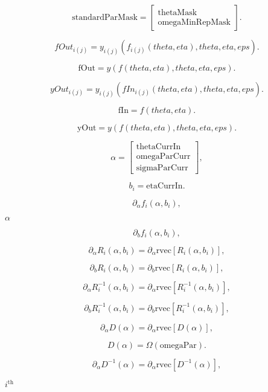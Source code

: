 \documentclass{article}
\begin{document}
\[ \mbox{standardParMask} = \left[ \begin{array}{c} \mbox{thetaMask} \\ \mbox{omegaMinRepMask} \end{array} \right] . \]
\pagebreak

\[ fOut_{i(j)} = y_{i(j)}( f_{i(j)}(theta, eta), theta, eta, eps) . \]
\pagebreak

\[ \mbox{fOut} = y(f(theta, eta), theta, eta, eps) . \]
\pagebreak

\[ yOut_{i(j)} = y_{i(j)}( fIn_{i(j)}(theta, eta), theta, eta, eps) . \]
\pagebreak

\[ \mbox{fIn} = f(theta, eta) . \]
\pagebreak

\[ \mbox{yOut} = y(f(theta, eta), theta, eta, eps) . \]
\pagebreak

\[ \alpha = \left[ \begin{array}{c} \mbox{thetaCurrIn} \\ \mbox{omegaParCurr} \\ \mbox{sigmaParCurr} \end{array} \right] , \]
\pagebreak

\[ b_i = \mbox{etaCurrIn} . \]
\pagebreak

\[ \partial_{\alpha} f_i(\alpha, b_i) , \]
\pagebreak

$ \alpha $
\pagebreak

\[ \partial_b f_i(\alpha, b_i) , \]
\pagebreak

\[ \partial_{\alpha} R_i(\alpha, b_i) = \partial_{\alpha} \mbox{rvec} \left[ R_i(\alpha, b_i) \right] , \]
\pagebreak

\[ \partial_b R_i(\alpha, b_i) = \partial_b \mbox{rvec} \left[ R_i(\alpha, b_i) \right] , \]
\pagebreak

\[ \partial_{\alpha} R^{-1}_i(\alpha, b_i) = \partial_{\alpha} \mbox{rvec} \left[ R^{-1}_i(\alpha, b_i) \right] , \]
\pagebreak

\[ \partial_b R^{-1}_i(\alpha, b_i) = \partial_b \mbox{rvec} \left[ R^{-1}_i(\alpha, b_i) \right] , \]
\pagebreak

\[ \partial_{\alpha} D(\alpha) = \partial_{\alpha} \mbox{rvec} \left[ D(\alpha) \right] , \]
\pagebreak

\[ D(\alpha) = \Omega(\mbox{omegaPar}) . \]
\pagebreak

\[ \partial_{\alpha} D^{-1}(\alpha) = \partial_{\alpha} \mbox{rvec} \left[ D^{-1}(\alpha) \right] , \]
\pagebreak

$i^{\mbox{th}}$
\pagebreak
\end{document}

